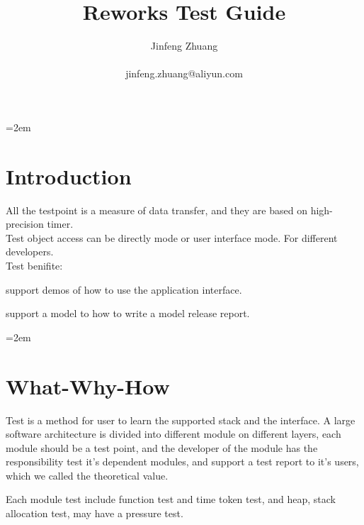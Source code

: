 \documentclass[a4paper]{article}
\title{Reworks Test Guide}
\author{Jinfeng Zhuang \\ \\ jinfeng.zhuang@aliyun.com}
\date{}
\let\oldsection\section
\renewcommand{\section}{\leftskip=2em \oldsection}
\begin{document}
\maketitle

\vspace{130pt}

\begin{center}
\end{center}

\thispagestyle{empty}

\newpage
\setcounter{page}{1}

\tableofcontents

\newpage
\setcounter{page}{1}

\section{Introduction}

All the testpoint is a measure of data transfer, and they are based on high-precision timer.\\
Test object access can be directly mode or user interface mode. For different developers.\\
Test benifite:

support demos of how to use the application interface.

support a model to how to write a model release report.


\section{What-Why-How}

Test is a method for user to learn the supported stack and the interface. A large software architecture is divided into different module on different layers, each module should be a test point, and the developer of the module has the responsibility test it's dependent modules, and support a test report to it's users, which we called the theoretical value.

Each module test include function test and time token test, and heap, stack allocation test, may have a pressure test.
\end{document}
